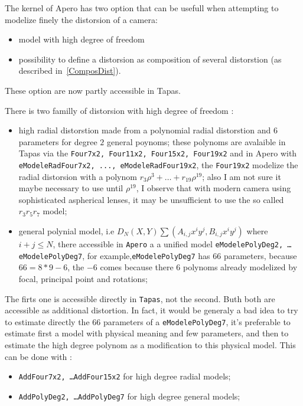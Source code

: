 The kernel of Apero has two option that can be usefull when attempting to modelize finely the distorsion of a camera:

\begin{itemize}
   \item model with high degree of freedom
   \item possibility to define a distorsion as composition of several distorstion (as described in~\ref{ComposDist}).
\end{itemize}

These option are now partly accessible in Tapas.

There is two familly of distorsion with high degree of freedom :


\begin{itemize}
   \item high radial distorstion made from a polynomial radial distorstion and $6$ parameters for degree $2$
         general poynoms; these polynoms are avalaible in Tapas via the {\tt Four7x2, Four11x2, Four15x2, Four19x2}
         and in Apero with {\tt eModeleRadFour7x2, ..., eModeleRadFour19x2}, the {\tt Four19x2} modelize the radial
         distorsion with a polynom $r_3 \rho^3 +\dots + r_{19} \rho^{19}$; also I am not sure it maybe necessary to
         use until $ \rho^{19}$, I observe that with modern camera using sophisticated aspherical lenses, it may be
         unsufficient to use the so called $r_3 r_5 r_7$ model;
         

   \item general polynial model, i.e $D_N(X,Y) \sum (A_{i,j} x^iy^j,B_{i,j} x^iy^j)$  where $i+j\leq N$,
         there accessible in {\tt Apero} a a unified model {\tt eModelePolyDeg2, \dots eModelePolyDeg7},
         for example,{\tt eModelePolyDeg7} has $66$ parameters, because $66=8*9-6$, the $-6$ comes because
         there $6$ polynoms already modelized by focal, principal point and rotations; 
\end{itemize}

The firts one is accessible directly in {\tt Tapas}, not the second. Buth both are accessible as additional distortion.
In fact, it would be generaly a bad idea to try to estimate directly the $66$ parameters of a {\tt eModelePolyDeg7}, it's
preferable to estimate first a model with physical meaning and few parameters, and then to estimate the high degree polynom
as a modification to this physical model. This can be done with :

\begin{itemize}
    \item  {\tt AddFour7x2,  \dots AddFour15x2} for high degree radial models;
    \item  {\tt AddPolyDeg2, \dots AddPolyDeg7} for high degree general models;
\end{itemize}

